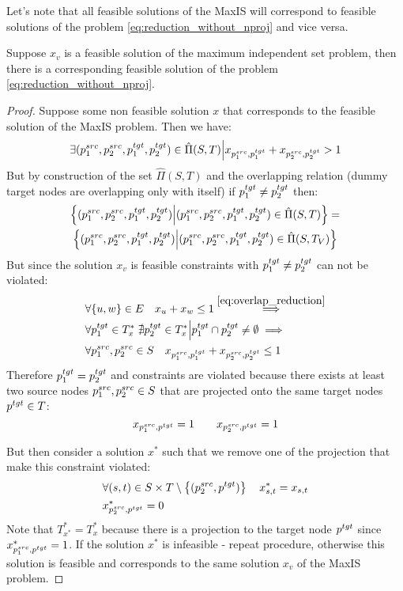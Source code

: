 Let's note that all feasible solutions of the MaxIS will correspond to feasible solutions of the
problem \ref{eq:reduction_without_nproj} and vice versa.

\begin{lemma} \label{lemma:maxis_f_implies_ilp}
  Suppose \( x_v \) is a feasible solution of the maximum independent set problem, then there is a
  corresponding feasible solution of the problem \eqref{eq:reduction_without_nproj}.
\end{lemma}
\begin{proof}
  Suppose some non feasible solution \( x \) that corresponds to the feasible solution of the
  MaxIS problem. Then we have:
  \[
    \exists (p_1^{src}, p_2^{src}, p_1^{tgt}, p_2^{tgt}) \in \hat{\Pi}(S, T) \Big|
    x_{p_1^{src}, p_1^{tgt}} + x_{p_2^{src}, p_2^{tgt}} > 1
  \]
  But by construction of the set \( \hat{\Pi}(S, T) \) and the overlapping relation (dummy target nodes
  are overlapping only with itself) if \( p_1^{tgt} \neq p_2^{tgt} \) then:
  \begin{multline*}
    \left\{ (p_1^{src}, p_2^{src}, p_1^{tgt}, p_2^{tgt}) \Big| (p_1^{src}, p_2^{src}, p_1^{tgt}, p_2^{tgt}) \in \hat{\Pi}(S, T) \right\} = \\
    \left\{ (p_1^{src}, p_2^{src}, p_1^{tgt}, p_2^{tgt}) \Big| (p_1^{src}, p_2^{src}, p_1^{tgt}, p_2^{tgt}) \in \hat{\Pi}(S, T_V) \right\}
  \end{multline*}
  But since the solution \( x_v \) is feasible constraints with  \( p_1^{tgt} \neq p_2^{tgt} \) can not be violated:
  \begin{align*}
    & \forall \{ u, w \} \in E \quad x_u + x_w \leq 1 \stackrel{\eqref{eq:overlap_reduction}}{\implies}                  \\
    & \forall p_1^{tgt} \in T^*_x \; \nexists p_2^{tgt} \in T^*_x \Big| p_1^{tgt} \cap p_2^{tgt} \neq \emptyset \implies \\
    & \forall p_1^{src}, p_2^{src} \in S \quad x_{p_1^{src}, p_1^{tgt}} + x_{p_2^{src}, p_2^{tgt}} \leq 1
  \end{align*}
  Therefore \( p_1^{tgt} = p_2^{tgt} \) and constraints are violated because there exists
  at least two source nodes \( p_1^{src}, p_2^{src} \in S \) that are projected onto the same target nodes \( p^{tgt} \in T \):
  \[
    x_{p_1^{src}, p^{tgt}} = 1 \qquad x_{p_2^{src}, p^{tgt}} = 1
  \]

  But then consider a solution \( x^* \) such that we remove one of the projection that
  make this constraint violated:
  \begin{align*}
    & \forall (s,t) \in S \times T \setminus \left\{ (p_2^{src}, p^{tgt}) \right\}
    \quad x^*_{s,t} = x_{s,t} \\
    & x^*_{p_2^{src}, p^{tgt}} = 0
  \end{align*}
  Note that \( T^*_{x^*} = T^*_x  \) because there is a projection to the target node \( p^{tgt} \)
  since \( \)  \( x^*_{p_1^{src}, p^{tgt}} = 1 \).
  If the solution \( x^* \) is infeasible - repeat procedure, otherwise
  this solution is feasible and corresponds to the same solution \( x_v \) of the MaxIS problem.
\end{proof}

